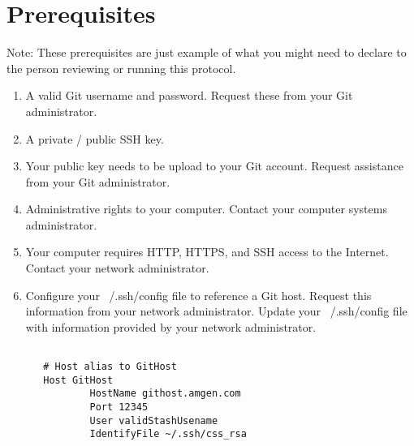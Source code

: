 \section{Prerequisites}
Note: These prerequisites are just example of what you might need to declare to
the person reviewing or running this protocol.

\begin{enumerate}
\item
A valid Git username and password.  Request these from your Git administrator.

\item
A private / public SSH key.

\item
Your public key needs to be upload to your Git account.  Request assistance from
your Git administrator.

\item
Administrative rights to your computer.  Contact your computer systems
administrator.

\item
Your computer requires HTTP, HTTPS, and SSH access to the Internet.  Contact
your network administrator.

\item
Configure your ~/.ssh/config file to reference a Git host.  Request this
information from your network administrator.  Update your ~/.ssh/config file
with information provided by your network administrator.

\begin{verbatim}

   # Host alias to GitHost
   Host GitHost
           HostName githost.amgen.com
           Port 12345
           User validStashUsename
           IdentifyFile ~/.ssh/css_rsa

\end{verbatim}

\end{enumerate}
